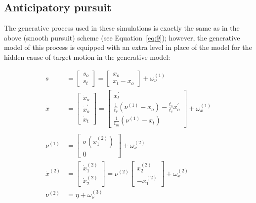 \documentclass[a4paper]{article} %
\begin{document}
\subsection{Anticipatory pursuit}

The generative process used in these simulations is exactly the same as
in the above (smooth pursuit) scheme (see Equation~\ref{eq:9}); however, the
generative model of this process is equipped with an extra level in
place of the model for the hidden cause of target motion in the
generative model:

\begin{align}
s &=  \left[\begin{array}{c} s_o \\ s_t \end{array}\right] =  \left[\begin{array}{c} x_o \\  x_t - x_o \end{array}\right] + \omega^{(1)}_\nu \nonumber \\%
\dot{x} &=  \left[\begin{array}{c} \dot{x}_o \\ \dot{x}^{\prime}_o \\ \dot{x}_t \end{array}\right] =  \left[\begin{array}{c} {x}^{\prime}_t \\ \frac{1}{t_v}(\nu^{(1)}-x_o) - \frac{t_s}{t_v}{x}^{\prime}_o \\  \frac{1}{t_m}(\nu^{(1)} -  x_t) \end{array}\right] + \omega^{(1)}_x \nonumber \\  %
 \label{eq:10} \\%
\nu^{(1)} &=  \left[\begin{array}{c} \sigma(x^{(2)}_1 ) \\ 0 \end{array}\right] + \omega^{(2)}_\nu \nonumber \\%
\dot{x}^{(2)} &=  \left[\begin{array}{c} \dot{x}^{(2)}_1 \\ \dot{x}^{(2)}_2 \end{array}\right] =  \nu^{(2)} \left[\begin{array}{c} x^{(2)}_2 \\ -x^{(2)}_1 \end{array}\right] + \omega^{(2)}_x \nonumber \\  %
\nu^{(2)} &= \eta + \omega^{(3)}_\nu \nonumber %
\end{align}%
\end{document}

